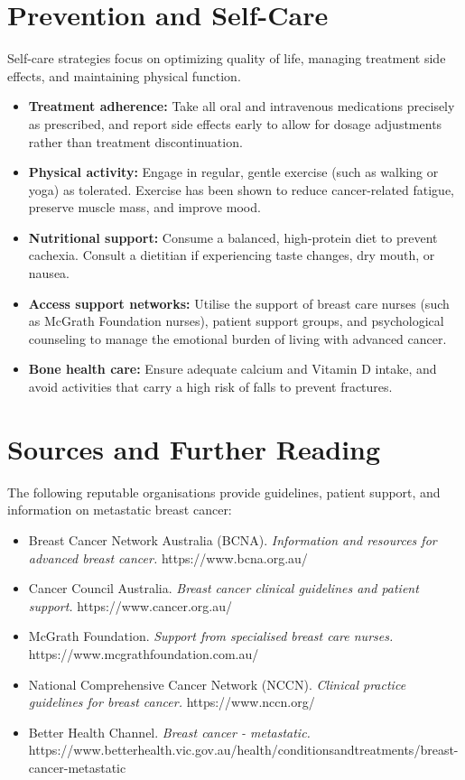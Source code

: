 \section*{Prevention and Self-Care}
Self-care strategies focus on optimizing quality of life, managing treatment side effects, and maintaining physical function.
\begin{itemize}
    \item \textbf{Treatment adherence:} Take all oral and intravenous medications precisely as prescribed, and report side effects early to allow for dosage adjustments rather than treatment discontinuation.
    \item \textbf{Physical activity:} Engage in regular, gentle exercise (such as walking or yoga) as tolerated. Exercise has been shown to reduce cancer-related fatigue, preserve muscle mass, and improve mood.
    \item \textbf{Nutritional support:} Consume a balanced, high-protein diet to prevent cachexia. Consult a dietitian if experiencing taste changes, dry mouth, or nausea.
    \item \textbf{Access support networks:} Utilise the support of breast care nurses (such as McGrath Foundation nurses), patient support groups, and psychological counseling to manage the emotional burden of living with advanced cancer.
    \item \textbf{Bone health care:} Ensure adequate calcium and Vitamin D intake, and avoid activities that carry a high risk of falls to prevent fractures.
\end{itemize}

\section*{Sources and Further Reading}
The following reputable organisations provide guidelines, patient support, and information on metastatic breast cancer:
\begin{itemize}
    \item Breast Cancer Network Australia (BCNA). \textit{Information and resources for advanced breast cancer.} https://www.bcna.org.au/
    \item Cancer Council Australia. \textit{Breast cancer clinical guidelines and patient support.} https://www.cancer.org.au/
    \item McGrath Foundation. \textit{Support from specialised breast care nurses.} https://www.mcgrathfoundation.com.au/
    \item National Comprehensive Cancer Network (NCCN). \textit{Clinical practice guidelines for breast cancer.} https://www.nccn.org/
    \item Better Health Channel. \textit{Breast cancer - metastatic.} https://www.betterhealth.vic.gov.au/health/conditionsandtreatments/breast-cancer-metastatic
\end{itemize}
